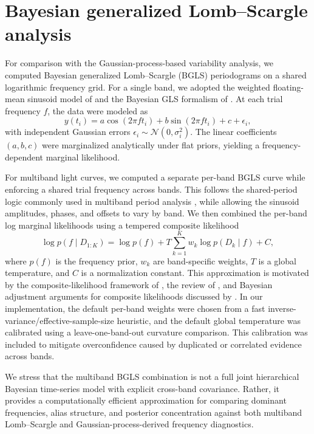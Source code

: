 \section{Bayesian generalized Lomb--Scargle analysis}
\label{sec:bgls_method}

For comparison with the Gaussian-process-based variability analysis, we computed Bayesian generalized Lomb--Scargle (BGLS) periodograms on a shared logarithmic frequency grid.  For a single band, we adopted the weighted floating-mean sinusoid model of \citet{zechmeister2009} and the Bayesian GLS formalism of \citet{mortier2015}.  At each trial frequency \(f\), the data were modeled as
\begin{equation}
y(t_i) = a \cos(2\pi f t_i) + b \sin(2\pi f t_i) + c + \epsilon_i,
\end{equation}
with independent Gaussian errors \(\epsilon_i \sim \mathcal{N}(0,\sigma_i^2)\).  The linear coefficients \((a,b,c)\) were marginalized analytically under flat priors, yielding a frequency-dependent marginal likelihood.

For multiband light curves, we computed a separate per-band BGLS curve while enforcing a shared trial frequency across bands.  This follows the shared-period logic commonly used in multiband period analysis \citep{vanderplas2015}, while allowing the sinusoid amplitudes, phases, and offsets to vary by band.  We then combined the per-band log marginal likelihoods using a tempered composite likelihood
\begin{equation}
\log p(f \mid D_{1:K}) =
\log p(f) + T \sum_{k=1}^{K} w_k \log p(D_k \mid f) + C,
\end{equation}
where \(p(f)\) is the frequency prior, \(w_k\) are band-specific weights, \(T\) is a global temperature, and \(C\) is a normalization constant.  This approximation is motivated by the composite-likelihood framework of \citet{lindsay1988}, the review of \citet{varin2011}, and Bayesian adjustment arguments for composite likelihoods discussed by \citet{ribatet2012}.  In our implementation, the default per-band weights were chosen from a fast inverse-variance/effective-sample-size heuristic, and the default global temperature was calibrated using a leave-one-band-out curvature comparison.  This calibration was included to mitigate overconfidence caused by duplicated or correlated evidence across bands.

We stress that the multiband BGLS combination is not a full joint hierarchical Bayesian time-series model with explicit cross-band covariance.  Rather, it provides a computationally efficient approximation for comparing dominant frequencies, alias structure, and posterior concentration against both multiband Lomb--Scargle and Gaussian-process-derived frequency diagnostics.

